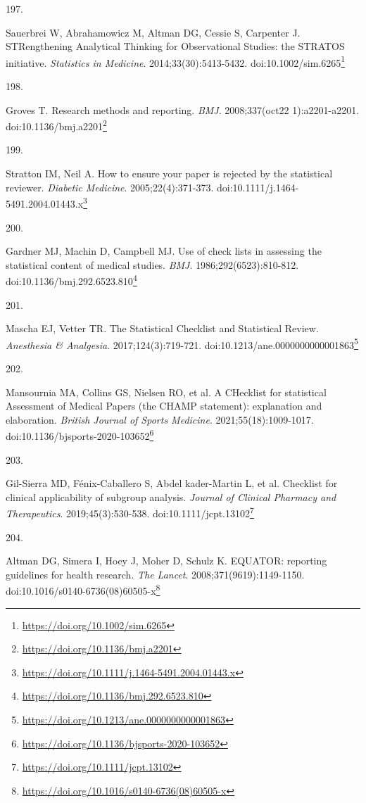 \documentclass[
  a4paper,
]{book}
\newlength{\cslhangindent}
\newlength{\csllabelwidth}
\newlength{\cslentryspacingunit} %
\newenvironment{CSLReferences}[2] %
 {%
  \setlength{\parindent}{0pt}
  \ifodd #1
  \let\oldpar\par
  \def\par{\hangindent=\cslhangindent\oldpar}
  \fi
  \setlength{\parskip}{#2\cslentryspacingunit}
 }%
 {}
\newcommand{\CSLLeftMargin}[1]{\parbox[t]{\csllabelwidth}{#1}}
\newcommand{\CSLRightInline}[1]{\parbox[t]{\linewidth - \csllabelwidth}{#1}\break}
\renewcommand{\href}[2]{#2\footnote{\url{#1}}}
\begin{document}
\begin{CSLReferences}{0}{0}
\leavevmode{}%
\CSLLeftMargin{197. }%
\CSLRightInline{Sauerbrei W, Abrahamowicz M, Altman DG, Cessie S, Carpenter J. STRengthening Analytical Thinking for Observational Studies: the STRATOS initiative. \emph{Statistics in Medicine}. 2014;33(30):5413-5432. doi:\href{https://doi.org/10.1002/sim.6265}{10.1002/sim.6265}}

\leavevmode{}%
\CSLLeftMargin{198. }%
\CSLRightInline{Groves T. Research methods and reporting. \emph{BMJ}. 2008;337(oct22 1):a2201-a2201. doi:\href{https://doi.org/10.1136/bmj.a2201}{10.1136/bmj.a2201}}

\leavevmode{}%
\CSLLeftMargin{199. }%
\CSLRightInline{Stratton IM, Neil A. How to ensure your paper is rejected by the statistical reviewer. \emph{Diabetic Medicine}. 2005;22(4):371-373. doi:\href{https://doi.org/10.1111/j.1464-5491.2004.01443.x}{10.1111/j.1464-5491.2004.01443.x}}

\leavevmode{}%
\CSLLeftMargin{200. }%
\CSLRightInline{Gardner MJ, Machin D, Campbell MJ. Use of check lists in assessing the statistical content of medical studies. \emph{BMJ}. 1986;292(6523):810-812. doi:\href{https://doi.org/10.1136/bmj.292.6523.810}{10.1136/bmj.292.6523.810}}

\leavevmode{}%
\CSLLeftMargin{201. }%
\CSLRightInline{Mascha EJ, Vetter TR. The Statistical Checklist and Statistical Review. \emph{Anesthesia \& Analgesia}. 2017;124(3):719-721. doi:\href{https://doi.org/10.1213/ane.0000000000001863}{10.1213/ane.0000000000001863}}

\leavevmode{}%
\CSLLeftMargin{202. }%
\CSLRightInline{Mansournia MA, Collins GS, Nielsen RO, et al. A CHecklist for statistical Assessment of Medical Papers (the CHAMP statement): explanation and elaboration. \emph{British Journal of Sports Medicine}. 2021;55(18):1009-1017. doi:\href{https://doi.org/10.1136/bjsports-2020-103652}{10.1136/bjsports-2020-103652}}

\leavevmode{}%
\CSLLeftMargin{203. }%
\CSLRightInline{Gil-Sierra MD, Fénix-Caballero S, Abdel kader-Martin L, et al. Checklist for clinical applicability of subgroup analysis. \emph{Journal of Clinical Pharmacy and Therapeutics}. 2019;45(3):530-538. doi:\href{https://doi.org/10.1111/jcpt.13102}{10.1111/jcpt.13102}}

\leavevmode{}%
\CSLLeftMargin{204. }%
\CSLRightInline{Altman DG, Simera I, Hoey J, Moher D, Schulz K. EQUATOR: reporting guidelines for health research. \emph{The Lancet}. 2008;371(9619):1149-1150. doi:\href{https://doi.org/10.1016/s0140-6736(08)60505-x}{10.1016/s0140-6736(08)60505-x}}

\end{CSLReferences}

\newpage

\backmatter


\end{document}

